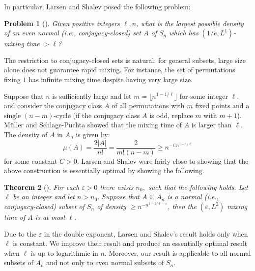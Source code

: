 \documentclass[11pt, letterpaper]{amsart}
\newtheorem{thm}{Theorem}[section]
\newtheorem{problem}[thm]{Problem}
\newcommand\eps{\varepsilon}
\renewcommand\ge{\geqslant}
\renewcommand\le{\leqslant}
\renewcommand{\epsilon}{\eps}
\begin{document}

In particular, Larsen and Shalev posed the following problem:
\begin{problem}[\cite{larsen2008characters}]
    Given positive integers $\ell, n$, what is the largest possible density of an even normal (i.e., conjugacy-closed) set $A$ of $S_n$ which has $(1/e,L^1)$-mixing time $> \ell$?
\end{problem}

The restriction to conjugacy-closed sets is natural: for general subsets, large size alone does not guarantee rapid mixing. For instance, the set of permutations fixing $1$ has infinite mixing time despite having very large size.

Suppose that $n$ is sufficiently large and let $m = \lfloor n^{1-1/\ell} \rfloor$ for some integer $\ell$, and consider the conjugacy class $A$ of all permutations with $m$ fixed points and a single $(n- m)$-cycle (if the conjugacy class $A$ is odd, replace $m$ with $m+1$). M\"{u}ller and Schlage-Puchta \cite{muller2007character} showed that the mixing time of $A$ is larger than $\ell$. The density of $A$ in $A_n$ is given by: 
\[\mu(A) = \frac{2|A|}{n!} = \frac{2}{m!(n-m)} \ge n^{-Cn^{1-1/\ell}}\]
for some constant $C>0$. %
Larsen and Shalev were fairly close to showing that the above construction is essentially optimal by showing the following. 
\begin{thm}[{\cite[Theorem 6.8]{larsen2008characters}}]
For each $\epsilon>0$ there exists $n_0,$ such that the following holds. Let $\ell$ be an integer and let $n>n_0.$ Suppose that $A \subseteq A_n$ is a normal (i.e., conjugacy-closed) subset of $S_n$ of density $\ge n^{-n^{1- 1/\ell - \epsilon}}$, then the $(\epsilon, L^2)$ mixing time of $A$ is at most $\ell.$  
\end{thm}

Due to the $\epsilon$ in the double exponent, Larsen and Shalev's result holds only when $\ell$ is constant. We improve their result and produce an essentially optimal result when $\ell$ is up to logarithmic in $n$. Moreover, our result is applicable to all normal subsets of $A_n$ and not only to even normal subsets of $S_n$.
\end{document}
